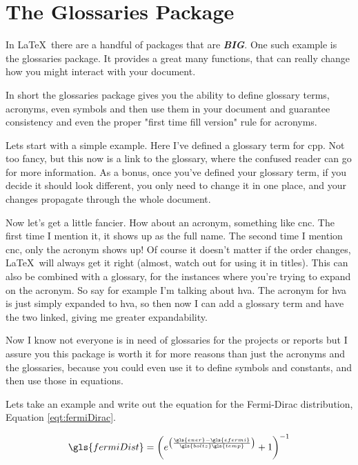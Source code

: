 \documentclass[hidelinks, float=false, crop=false]{article}
\begin{document}
    \section{The Glossaries Package}
        In \LaTeX~there are a handful of packages that are \textbf{\textit{BIG}}. One such example
        is the glossaries package. It provides a great many functions, that can really change how
        you might interact with your document. 

        In short the glossaries package gives you the ability to define glossary terms, acronyms, 
        even symbols and then use them in your document and guarantee consistency and even the proper
        "first time fill version" rule for acronyms.

        Lets start with a simple example. Here I've defined a glossary term for \gls{cpp}. Not 
        too fancy, but this now is a link to the glossary, where the confused reader can go for more
        information. As a bonus, once you've defined your glossary term, if you decide it should look 
        different, you only need to change it in one place, and your changes propagate through the
        whole document.
        
        Now let's get a little fancier. How about an acronym, something like \gls{cnc}. The first time
        I mention it, it shows up as the full name. The second time I mention \gls{cnc}, only the 
        acronym shows up! Of course it doesn't matter if the order changes, \LaTeX~will always get it 
        right (almost, watch out for using it in titles). This can also be combined with a glossary,
        for the instances where you're trying to expand on the acronym. So say for example I'm talking
        about \gls{hva}. The acronym for \gls{hva} is just simply expanded to \glsdesc{hva},
        so then now I can add a glossary term and have the two linked, giving me greater expandability.

        Now I know not everyone is in need of glossaries for the projects or reports but I assure you
        this package is worth it for more reasons than just the acronyms and the glossaries, because
        you could even use it to define symbols and constants, and then use those in equations.

        Lets take an example and write out the equation for the Fermi-Dirac distribution, Equation \ref{eqt:fermiDirac}.

        \begin{equation}
            \gls{fermiDist} = \left(e^{\left(\frac{\gls{ener}-\gls{efermi}}{\gls{boltz}\gls{temp}}\right)}+1\right)^{-1}
            \label{eqt:fermiDirac}
        \end{equation}
\end{document}
